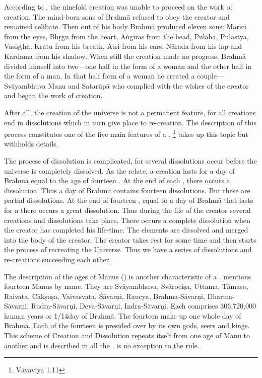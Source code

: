 According to , the ninefold creation was unable to proceed on
the work of creation. The mind-born sons of Brahmā refused to obey the creator
and remained celibate. Then out of his body Brahmā produced eleven sons: Marīci
from the eyes, Bhṛgu from the heart, Aṅgiras from the head, Pulaha, Pulastya,
Vasiṣṭha, Kratu from his breath, Atri from his ears, Nārada from his lap and
Kardama from his shadow. When still the creation made no progress, Brahmā divided
himself into two—one half in the form of a woman and the other half in the form
of a man. In that half form of a woman he created a couple—Svāyambhuva Manu
and Satarūpā who complied with the wishes of the creator and began the work of
creation.

After all, the creation of the universe is not a permanent feature, for all
creations end in dissolutions which in turn give place to re-creation.
The description of this process constitutes one of the five main features of
a . \footnote{Vāyavīya 1.11} takes up this topic
but withholds details.

The process of dissolution is complicated, for several dissolutions occur before
the universe is completely dissolved. As the relate, a creation
lasts for a day of Brahmā equal to the age of fourteen . At the
end of each , there occurs a dissolution. Thus a day of Brahmā
contains fourteen dissolutions. But these are partial dissolutions. At the end of
fourteen , equal to a day of Brahmā that lasts for a 
there occurs a great dissolution. Thus during the life of the creator several
creations and dissolutions take place. There occurs a complete dissolution when
the creator has completed his life-time. The elements are dissolved and merged
into the body of the creator. The creator takes rest for some time and then
starts the process of recreating the Universe. Thus we have a series of
dissolutions and re-creations succeeding each other.

The description of the ages of Manus () is another
characteristic of a .  mentions fourteen Manus
by name. They are Svāyambhuva, Svārociṣa, Uttama, Tāmasa, Raivata, Cākṣuṣa,
Vaivasvata, Śāvarṇi, Raucya, Brahma-Sāvarṇi, Dharma-Sāvarṇi, Rudra-Sāvarṇi,
Deva-Sāvarṇi, Indra-Sāvarṇi. Each  comprises 306,720,000 human
years or 1/14\th day of Brahmā. The fourteen  make up one whole
day of Brahmā. Each of the fourteen  is presided over by its
own gods, seers and kings. This scheme of Creation and Dissolution repeats
itself from one age of Manu to another and is described in all the
.  is no exception to the rule.


